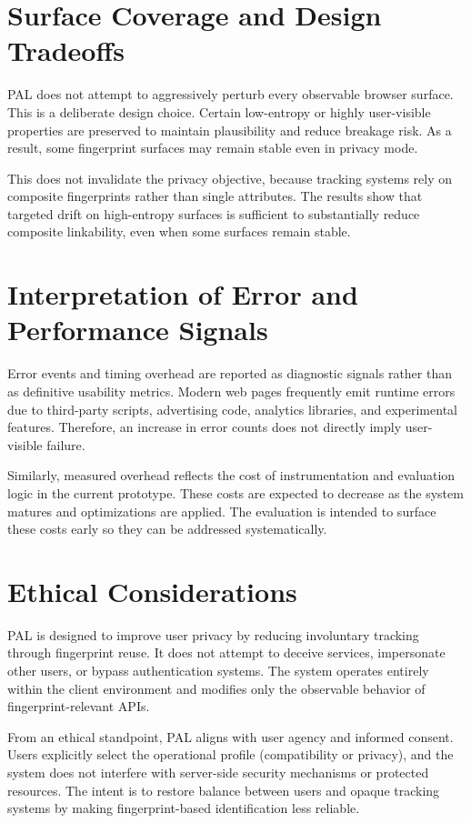 \documentclass[11pt]{report}
\begin{document}
\section{Surface Coverage and Design Tradeoffs}

PAL does not attempt to aggressively perturb every observable browser surface. This is a deliberate design choice. Certain low-entropy or highly user-visible properties are preserved to maintain plausibility and reduce breakage risk. As a result, some fingerprint surfaces may remain stable even in privacy mode.

This does not invalidate the privacy objective, because tracking systems rely on composite fingerprints rather than single attributes. The results show that targeted drift on high-entropy surfaces is sufficient to substantially reduce composite linkability, even when some surfaces remain stable.

\section{Interpretation of Error and Performance Signals}

Error events and timing overhead are reported as diagnostic signals rather than as definitive usability metrics. Modern web pages frequently emit runtime errors due to third-party scripts, advertising code, analytics libraries, and experimental features. Therefore, an increase in error counts does not directly imply user-visible failure.

Similarly, measured overhead reflects the cost of instrumentation and evaluation logic in the current prototype. These costs are expected to decrease as the system matures and optimizations are applied. The evaluation is intended to surface these costs early so they can be addressed systematically.

\section{Ethical Considerations}

PAL is designed to improve user privacy by reducing involuntary tracking through fingerprint reuse. It does not attempt to deceive services, impersonate other users, or bypass authentication systems. The system operates entirely within the client environment and modifies only the observable behavior of fingerprint-relevant APIs.

From an ethical standpoint, PAL aligns with user agency and informed consent. Users explicitly select the operational profile (compatibility or privacy), and the system does not interfere with server-side security mechanisms or protected resources. The intent is to restore balance between users and opaque tracking systems by making fingerprint-based identification less reliable.
\end{document}
